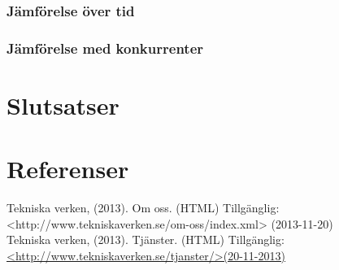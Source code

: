 \documentclass[10pt,a4paper]{article}
\begin{document}
\subsubsection{Jämförelse över tid}

\subsubsection{Jämförelse med konkurrenter}


\section{Slutsatser}

\section{Referenser}
Tekniska verken, (2013). Om oss. (HTML) Tillgänglig: \newline
<http://www.tekniskaverken.se/om-oss/index.xml> (2013-11-20)\\
Tekniska verken, (2013). Tjänster. (HTML) Tillgänglig: \\
\hyperref{http://www.tekniskaverken.se/tjanster/}{}{}{<http://www.tekniskaverken.se/tjanster/>(20-11-2013)}
\end{document}
